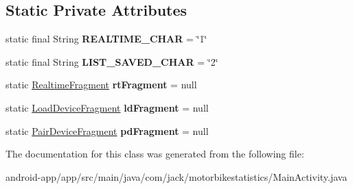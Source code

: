 \subsection*{Static Private Attributes}
\begin{DoxyCompactItemize}
\item 
\mbox{\label{classcom_1_1jack_1_1motorbikestatistics_1_1_main_activity_a6b63eb4aa15fd17f95f5d717e0e63108}} 
static final String {\bfseries R\+E\+A\+L\+T\+I\+M\+E\+\_\+\+C\+H\+AR} = \char`\"{}1\char`\"{}
\item 
\mbox{\label{classcom_1_1jack_1_1motorbikestatistics_1_1_main_activity_a853e8df63cac245f60ef82edaaa7ee31}} 
static final String {\bfseries L\+I\+S\+T\+\_\+\+S\+A\+V\+E\+D\+\_\+\+C\+H\+AR} = \char`\"{}2\char`\"{}
\item 
\mbox{\label{classcom_1_1jack_1_1motorbikestatistics_1_1_main_activity_a5d506143e7f082edf2078025c00f3715}} 
static \hyperlink{classcom_1_1jack_1_1motorbikestatistics_1_1_realtime_fragment}{Realtime\+Fragment} {\bfseries rt\+Fragment} = null
\item 
\mbox{\label{classcom_1_1jack_1_1motorbikestatistics_1_1_main_activity_ac2ac0c852d3352efd6368ee550ef3c3c}} 
static \hyperlink{classcom_1_1jack_1_1motorbikestatistics_1_1_load_device_fragment}{Load\+Device\+Fragment} {\bfseries ld\+Fragment} = null
\item 
\mbox{\label{classcom_1_1jack_1_1motorbikestatistics_1_1_main_activity_a2802ad16b5fdba42834d1b31e255dd96}} 
static \hyperlink{classcom_1_1jack_1_1motorbikestatistics_1_1_pair_device_fragment}{Pair\+Device\+Fragment} {\bfseries pd\+Fragment} = null
\end{DoxyCompactItemize}


The documentation for this class was generated from the following file\+:\begin{DoxyCompactItemize}
\item 
android-\/app/app/src/main/java/com/jack/motorbikestatistics/Main\+Activity.\+java\end{DoxyCompactItemize}
